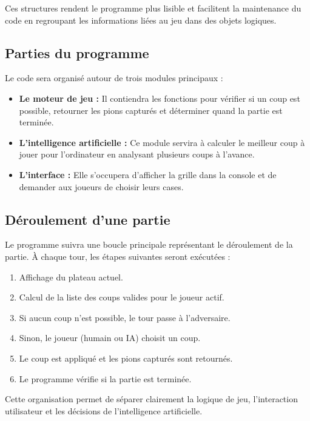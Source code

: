 \documentclass{article}
\begin{document}
Ces structures rendent le programme plus lisible et facilitent la maintenance du code en regroupant les informations liées au jeu dans des objets logiques.

\subsection{Parties du programme}

Le code sera organisé autour de trois modules principaux :

\begin{itemize}
    \item \textbf{Le moteur de jeu :} Il contiendra les fonctions pour vérifier si un coup est possible, retourner les pions capturés et déterminer quand la partie est terminée.
    \item \textbf{L'intelligence artificielle :} Ce module servira à calculer le meilleur coup à jouer pour l'ordinateur en analysant plusieurs coups à l'avance.
    \item \textbf{L'interface :} Elle s'occupera d'afficher la grille dans la console et de demander aux joueurs de choisir leurs cases.
\end{itemize}


\subsection{Déroulement d'une partie}

Le programme suivra une boucle principale représentant le déroulement de la partie. À chaque tour, les étapes suivantes seront exécutées :

\begin{enumerate}
    \item Affichage du plateau actuel.
    \item Calcul de la liste des coups valides pour le joueur actif.
    \item Si aucun coup n'est possible, le tour passe à l'adversaire.
    \item Sinon, le joueur (humain ou IA) choisit un coup.
    \item Le coup est appliqué et les pions capturés sont retournés.
    \item Le programme vérifie si la partie est terminée.
\end{enumerate}

Cette organisation permet de séparer clairement la logique de jeu, l'interaction utilisateur et les décisions de l'intelligence artificielle.
\end{document}
